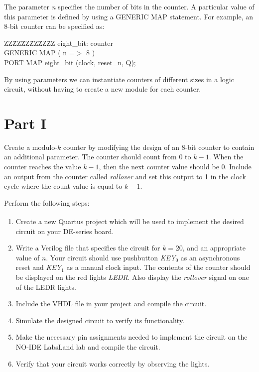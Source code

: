 \documentclass[epsfig,10pt,fullpage]{article}
\begin{document}
The parameter {\it n} specifies the number of bits in the counter. A particular value of 
this parameter is defined by using a GENERIC MAP statement. For example, an 8-bit 
counter can be specified as:

\begin{center}
\begin{minipage}[t]{12.5 cm}
\begin{tabbing}
ZZ\=ZZ\=ZZ\=ZZ\=ZZ\=ZZ\kill
\>eight\_bit: counter\\
\>\>GENERIC MAP ( n =$>$ 8 )\\
\>\>PORT MAP eight\_bit (clock, reset\_n, Q);
\end{tabbing}
\end{minipage}
\end{center}

By using parameters we can instantiate counters of different sizes in a logic circuit, without having to create a new module for each counter.

\section*{Part I}
Create a modulo-$k$ counter by modifying the design of an 8-bit counter to contain an 
additional parameter. The counter should count from $0$ to $k-1$. When the counter reaches 
the value $k-1$, then the next counter value should be $0$. Include an output from the
counter called {\it rollover} and set this output to 1 in the clock cycle where the count value
is equal to $k-1$.

Perform the following steps:
\begin{enumerate}
\item Create a new Quartus\textsuperscript{\textregistered} project which will be used to implement the desired circuit
on your DE-series board.
\item Write a Verilog file that specifies the circuit for {\it k} = 20, and an appropriate
value of $n$.  Your circuit should use pushbutton {\it KEY}$_0$ as an asynchronous reset 
and {\it KEY}$_1$ as a manual clock input. 
The contents of the counter should be displayed on the red lights {\it LEDR}. Also display 
the {\it rollover} signal on one of the LEDR lights.
\item Include the VHDL file in your project and compile the circuit.
\item Simulate the designed circuit to verify its functionality.
\item Make the necessary pin assignments needed to implement the circuit on the NO-IDE LabsLand lab and compile the circuit.
\item Verify that your circuit works correctly by observing the lights.
\end{enumerate}
\end{document}
